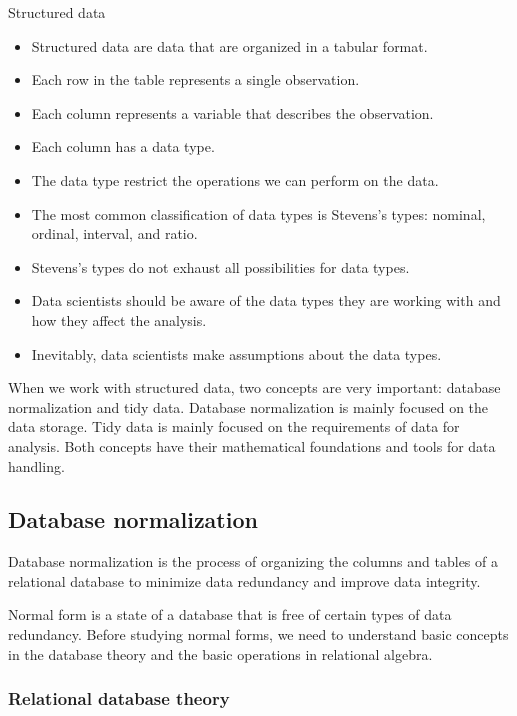 \begin{slidebox}{Structured data}{}
  \begin{itemize}
    \item Structured data are data that are organized in a tabular format.
    \item Each row in the table represents a single observation.
    \item Each column represents a variable that describes the observation.
    \item Each column has a data type.
    \item The data type restrict the operations we can perform on the data.
    \item The most common classification of data types is Stevens’s types: nominal,
      ordinal, interval, and ratio.
    \item Stevens’s types do not exhaust all possibilities for data types.
    \item Data scientists should be aware of the data types they are working with and
      how they affect the analysis.
    \item Inevitably, data scientists make assumptions about the data types.
  \end{itemize}
\end{slidebox}

When we work with structured data, two concepts are very important: database normalization
and tidy data.  Database normalization is mainly focused on the data storage.  Tidy data is
mainly focused on the requirements of data for analysis.  Both concepts have their
mathematical foundations and tools for data handling.

\subsection{Database normalization}

Database normalization is the process of organizing the columns and tables of a relational
database to minimize data redundancy and improve data integrity.

Normal form is a state of a database that is free of certain types of data redundancy.
Before studying normal forms, we need to understand basic concepts in the database theory
and the basic operations in relational algebra.

\subsubsection{Relational database theory}

